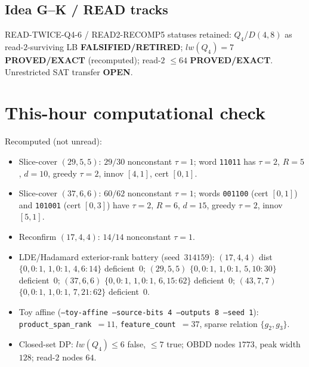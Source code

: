 \documentclass[11pt]{article}
\begin{document}
\subsection*{Idea G--K / READ tracks}
READ-TWICE-Q4-6 / READ2-RECOMP5 statuses retained: $Q_4$/$D(4,8)$ as read-$2$-surviving LB
\textbf{FALSIFIED/RETIRED}; $lw(Q_4)=7$ \textbf{PROVED/EXACT} (recomputed); read-$2$ $\le64$
\textbf{PROVED/EXACT}. Unrestricted SAT transfer \textbf{OPEN}.

\section*{This-hour computational check}
Recomputed (not unread):
\begin{itemize}
\item Slice-cover $(29,5,5)$: $29/30$ nonconstant $\tau{=}1$; word \texttt{11011} has
  $\tau{=}2$, $R{=}5$, $d{=}10$, greedy $\tau{=}2$, innov $[4,1]$, cert $[0,1]$.
\item Slice-cover $(37,6,6)$: $60/62$ nonconstant $\tau{=}1$; words \texttt{001100}
  (cert $[0,1]$) and \texttt{101001} (cert $[0,3]$) have $\tau{=}2$, $R{=}6$, $d{=}15$,
  greedy $\tau{=}2$, innov $[5,1]$.
\item Reconfirm $(17,4,4)$: $14/14$ nonconstant $\tau{=}1$.
\item LDE/Hadamard exterior-rank battery (seed~$314159$):
  $(17,4,4)$ dist $\{0,0{:}1,\,1,0{:}1,\,4,6{:}14\}$ deficient~$0$;
  $(29,5,5)$ $\{0,0{:}1,\,1,0{:}1,\,5,10{:}30\}$ deficient~$0$;
  $(37,6,6)$ $\{0,0{:}1,\,1,0{:}1,\,6,15{:}62\}$ deficient~$0$;
  $(43,7,7)$ $\{0,0{:}1,\,1,0{:}1,\,7,21{:}62\}$ deficient~$0$.
\item Toy affine (\texttt{--toy-affine --source-bits 4 --outputs 8 --seed 1}):
  \texttt{product\_span\_rank}~$=11$, \texttt{feature\_count}~$=37$, sparse relation $\{g_2,g_3\}$.
\item Closed-set DP: $lw(Q_4)\le6$ false, $\le7$ true; OBDD nodes $1773$, peak width $128$;
  read-$2$ nodes $64$.
\end{itemize}
\end{document}
